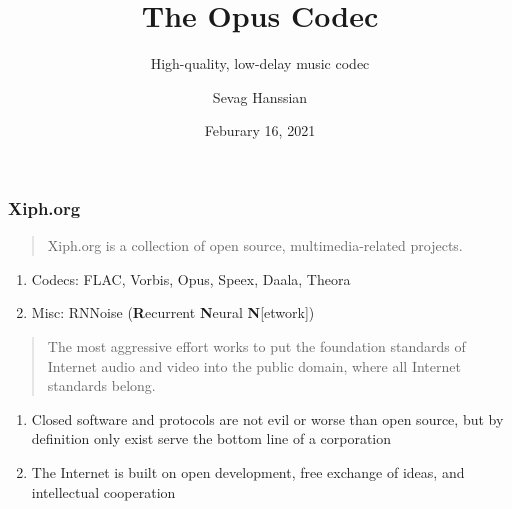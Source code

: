 \documentclass{beamer}
\title{The Opus Codec}
\subtitle{High-quality, low-delay music codec}
\author{Sevag Hanssian}
\date{Feburary 16, 2021}
\institute{MUMT 621, Winter 2021}
\begin{document}
\begin{frame}
\maketitle
\end{frame}

\begin{frame}
	\frametitle{Xiph.org}
	\begin{quote}
		Xiph.org is a collection of open source, multimedia-related projects.
	\end{quote}
	\begin{enumerate}
			\vspace{-0.5em}
		\item
			Codecs: FLAC, Vorbis, Opus, Speex, Daala, Theora
		\item
			Misc: RNNoise (\textbf{R}ecurrent \textbf{N}eural \textbf{N}[etwork])
	\end{enumerate}
	\vspace{1em}
	\begin{quote}
		The most aggressive effort works to put the foundation standards of Internet audio and video into the public domain, where all Internet standards belong.
	\end{quote}
	\begin{enumerate}
			\vspace{-0.5em}
		\item
			Closed software and protocols are not evil or worse than open source, but by definition only exist serve the bottom line of a corporation
		\item
			 The Internet is built on open development, free exchange of ideas, and intellectual cooperation
	\end{enumerate}
\end{frame}

\end{document}
